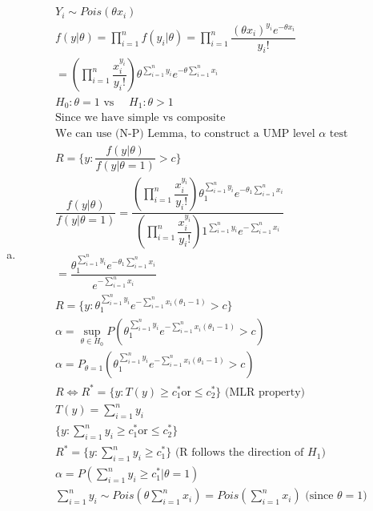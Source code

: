 \documentclass{article}
\newcommand{\sumn}{\sum_{i=1}^{n}}
\newcommand{\lra}{\Leftrightarrow}
\newcommand{\prodn}{\prod_{i=1}^{n}}
\newcommand{\sumx}{\sum_{i=1}^{n}x_i}
\newcommand{\ta}{\theta}
\newcommand{\te}{\theta_1}
\begin{document}
\begin{flushleft}
\begin{enumerate}[(a)]
	\item 
\begin{multline*}\\
Y_i\sim Pois(\ta x_i)\\
f(y|\ta)=\prodn f(y_i|\ta)=\prodn \dfrac{(\ta x_i)^{y_i}e^{-\ta x_i}}{y_i!}\\
=\left(\prodn\dfrac{x_i^{y_i}}{y_i!}\right)\ta^{\sumn y_i}e^{-\ta \sumx}\\
H_0:\ta=1 \text{ vs } \quad H_1:\ta>1\\
\text{Since we have simple vs composite}\\
\text{We can use (N-P) Lemma, to construct a UMP level } \alpha \text{ test}\\
R=\{y:\dfrac{f(y|\ta)}{f(y|\ta=1)}>c\}\\
\dfrac{f(y|\ta)}{f(y|\ta=1)}=\dfrac{\left(\prodn\dfrac{x_i^{y_i}}{y_i!}\right)\te^{\sumn y_i}e^{-\te \sumx}}{\left(\prodn\dfrac{x_i^{y_i}}{y_i!}\right)1^{\sumn y_i}e^{- \sumx}}\\
=\dfrac{\te^{\sumn y_i}e^{-\te \sumx}}{e^{-\sumx}}\\
R=\{y:\te^{\sumn y_i}e^{-\sumx (\te-1)}>c\}\\
\alpha=\sup_{\ta \in H_0}P(\te^{\sumn y_i}e^{-\sumx (\te-1)}>c)\\
\alpha=P_{\ta=1}(\te^{\sumn y_i}e^{-\sumx (\te-1)}>c)\\
R\lra R^*= \{y:T(y)\geq c_1^* \text{or} \leq c_2^* \} \text{ (MLR property)}\\
T(y)=\sumn y_i\\
\{y:\sumn y_i\geq c_1^* \text{or} \leq c_2^* \}\\
R^*=\{y:\sumn y_i \geq c_1^* \} \text{ (R follows the direction of } H_1)\\
\alpha=P(\sumn y_i\geq c_1^*|\ta=1)\\
\sumn y_i\sim Pois(\ta\sumx) =Pois(\sumx) \text{ (since } \ta=1)\\
\end{multline*}


\end{enumerate}
\end{flushleft}
\end{document}
